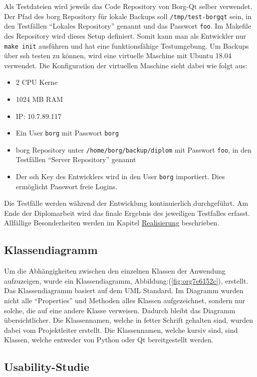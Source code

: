 Als Testdateien wird jeweils das Code Repository von Borg-Qt selber verwendet.
Der Pfad des \gls{borg} Repository für lokale Backups soll \texttt{/tmp/test-borgqt}
sein, in den Testfällen "`Lokales Repository"' genannt und das Passwort \texttt{foo}.
Im Makefile des Repository wird dieses Setup definiert. Somit kann man als
Entwickler nur \texttt{make init} ausführen und hat eine funktionsfähige Testumgebung.
\newpage
Um Backups über \gls{ssh} testen zu können, wird eine virtuelle Maschine mit Ubuntu
18.04 verwendet. Die Konfiguration der virtuellen Maschine sieht dabei wie
folgt aus:
\begin{itemize}
\item 2 CPU Kerne
\item 1024 MB RAM
\item IP: 10.7.89.117
\item Ein User \texttt{borg} mit Passwort \texttt{borg}
\item \gls{borg} Repository unter \texttt{/home/borg/backup/diplom} mit Passwort \texttt{foo}, in
den Testfällen "`Server Repository"' genannt
\item Der \gls{ssh} Key des Entwicklers wird in den User \texttt{borg} importiert. Dies
ermöglicht Passwort freie Logins.
\end{itemize}

Die Testfälle werden während der Entwicklung kontinuierlich durchgeführt. Am
Ende der Diplomarbeit wird das finale Ergebnis des jeweiligen Testfalles
erfasst. Allfällige Besonderheiten werden im Kapitel \hyperref[sec:orgb833f22]{Realisierung}
beschrieben.

\subsection{Klassendiagramm}
\label{sec:orgd8ab406}

Um die Abhängigkeiten zwischen den einzelnen Klassen der Anwendung aufzuzeigen,
wurde ein Klassendiagramm, Abbildung:(\ref{fig:org7e6152c}), erstellt. Das
Klassendiagramm basiert auf dem UML Standard. Im Diagramm wurden nicht alle
"`Properties"' und Methoden alles Klassen aufgezeichnet, sondern nur solche, die
auf eine andere Klasse verweisen. Dadurch bleibt das Diagramm übersichtlicher.
Die Klassennamen, welche in fetter Schrift gehalten sind, wurden dabei vom
Projektleiter erstellt. Die Klassennamen, welche kursiv sind, sind Klassen, welche
entweder von Python oder Qt bereitgestellt werden.

\subsection{Usability-Studie}
\label{sec:org4a36f83}

